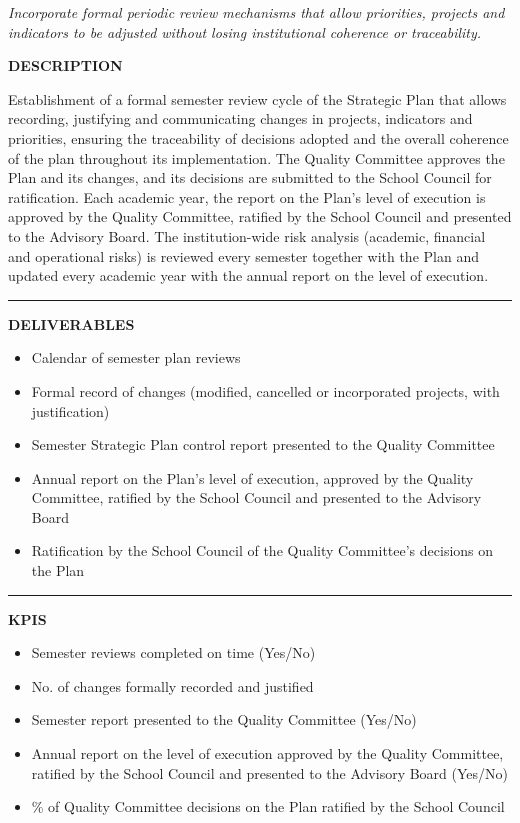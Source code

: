 \documentclass[11pt,a4paper]{scrreprt}
\newcommand{\fieldlabel}[1]{%
  {\footnotesize\sffamily\bfseries\color{mutedcolor}\MakeUppercase{#1}}\par\nopagebreak[4]
}
\newcommand{\fieldsep}{\vspace{3pt}\noindent\textcolor{bordercolor}{\rule{\linewidth}{0.4pt}}\vspace{3pt}\par}
\begin{document}
\newpage
{}
{\small\color{mutedcolor}\itshape Incorporate formal periodic review mechanisms that allow priorities, projects and indicators to be adjusted without losing institutional coherence or traceability.}\par\vspace{6pt}

\begin{tcolorbox}[pabox={gobcolor}{A.P.5.1 \enspace\textbullet\enspace Periodic Reviews and Change Management of the Strategic Plan}]

\fieldlabel{Description}
{\small Establishment of a formal semester review cycle of the Strategic Plan that allows recording, justifying and communicating changes in projects, indicators and priorities, ensuring the traceability of decisions adopted and the overall coherence of the plan throughout its implementation. The Quality Committee approves the Plan and its changes, and its decisions are submitted to the School Council for ratification. Each academic year, the report on the Plan's level of execution is approved by the Quality Committee, ratified by the School Council and presented to the Advisory Board. The institution-wide risk analysis (academic, financial and operational risks) is reviewed every semester together with the Plan and updated every academic year with the annual report on the level of execution.}\par
\fieldsep
\fieldlabel{Deliverables}
{\small \begin{itemize}[noitemsep,topsep=2pt]
\item Calendar of semester plan reviews
\item Formal record of changes (modified, cancelled or incorporated projects, with justification)
\item Semester Strategic Plan control report presented to the Quality Committee
\item Annual report on the Plan's level of execution, approved by the Quality Committee, ratified by the School Council and presented to the Advisory Board
\item Ratification by the School Council of the Quality Committee's decisions on the Plan
\end{itemize}}\par
\fieldsep
\fieldlabel{KPIs}
{\small \begin{itemize}[noitemsep,topsep=2pt]
\item Semester reviews completed on time (Yes/No)
\item No. of changes formally recorded and justified
\item Semester report presented to the Quality Committee (Yes/No)
\item Annual report on the level of execution approved by the Quality Committee, ratified by the School Council and presented to the Advisory Board (Yes/No)
\item \% of Quality Committee decisions on the Plan ratified by the School Council
\end{itemize}}\par
\end{tcolorbox}
\end{document}

